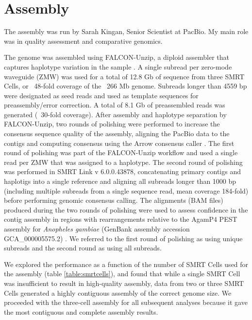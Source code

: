 \section{Assembly}

The assembly was run by Sarah Kingan, Senior Scientist at PacBio. My main role was in quality assessment and comparative genomics. \\

\par{
The genome was assembled using FALCON-Unzip, a diploid assembler that captures haplotype variation in the sample \cite{falcon}. A single subread per zero-mode waveguide (ZMW) was used for a total of 12.8 Gb of sequence from three SMRT Cells, or ~48-fold coverage of the ~266 Mb genome. Subreads longer than 4559 bp were designated as seed reads and used as template sequences for preassembly/error correction. A total of 8.1 Gb of preassembled reads was generated (~30-fold coverage). After assembly and haplotype separation by FALCON-Unzip, two rounds of polishing were performed to increase the consensus sequence quality of the assembly, aligning the PacBio data to the contigs and computing consensus using the Arrow consensus caller \cite{arrow}. The first round of polishing was part of the FALCON-Unzip workflow and used a single read per ZMW that was assigned to a haplotype. The second round of polishing was performed in SMRT Link v 6.0.0.43878, concatenating primary contigs and haplotigs into a single reference and aligning all subreads longer than 1000 bp (including multiple subreads from a single sequence read, mean coverage 184-fold) before performing genomic consensus calling. The alignments (BAM files) produced during the two rounds of polishing were used to assess confidence in the contig assembly in regions with rearrangements relative to the AgamP4 PEST assembly for \textit{Anopheles gambiae} (GenBank assembly accession GCA\_000005575.2) \cite{PEST}\cite{PEST2}. We referred to the first round of polishing as using unique subreads and the second round as using all subreads.
}

\par{
We explored the performance as a function of the number of SMRT Cells used for the assembly (table \ref{table:smrtcells}), and found that while a single SMRT Cell was insufficient to result in high-quality assembly, data from two or three SMRT Cells generated a highly contiguous assembly of the correct genome size. We proceeded with the three-cell assembly for all subsequent analyses because it gave the most contiguous and complete assembly results.
}

